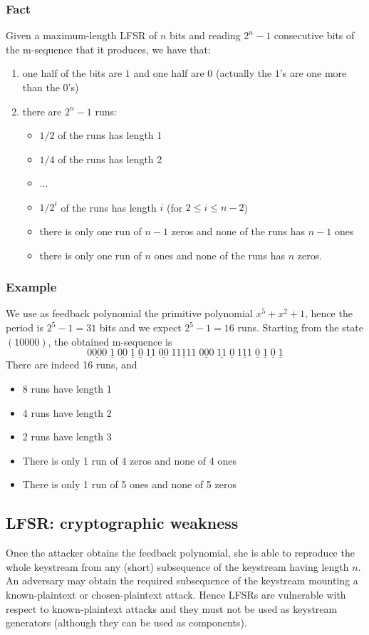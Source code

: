 \documentclass[a4paper, 10pt, titlepage]{article}
\begin{document}
\subsubsection*{Fact}
Given a maximum-length LFSR of $n$ bits and reading $2^n - 1$ consecutive bits of the m-sequence that it produces, we have that:
\begin{enumerate}
\item one half of the bits are $1$ and one half are $0$ (actually the $1$’s are one more than the $0$’s)
\item there are $2^n -1$ runs:
\begin{itemize}
\item $1/2$ of the runs has length 1
\item $1/4$ of the runs has length 2
\item ...
\item ${1/2}^i$ of the runs has length $i$ (for $2 \leq i \leq n - 2$)
\item there is only one run of $n - 1$ zeros and none of the runs has $n - 1$ ones
\item there is only one run of $n$ ones and none of the runs has $n$ zeros.
\end{itemize}
\end{enumerate}

\subsubsection*{Example}
We use as feedback polynomial the primitive polynomial $x^5 + x^2 + 1$,
hence the period is $2^5 - 1 = 31$ bits and we expect $2^5 - 1 = 16$ runs.
Starting from the state $(10000)$, the obtained m-sequence is
$$\underline{0000}\;\underline{1}\;\underline{00}\;\underline{1}\;\underline{0}\;\underline{11}\;\underline{00}\;\underline{11111}\;\underline{000}\;\underline{11}\;\underline{0}\;\underline{111}\;\underline{0}\;\underline{1}\;\underline{0}\;\underline{1}$$
There are indeed 16 runs, and
\begin{itemize}
\item 8 runs have length 1
\item 4 runs have length 2
\item 2 runs have length 3
\item There is only 1 run of 4 zeros and none of 4 ones
\item There is only 1 run of 5 ones and none of 5 zeros
\end{itemize}

\subsection{LFSR: cryptographic weakness}
Once the attacker obtains the feedback polynomial, she is able to reproduce the whole keystream from any (short) subsequence of the keystream having length $n$. An adversary may obtain the required subsequence of the keystream mounting a known-plaintext or chosen-plaintext attack. Hence LFSRs are vulnerable with respect to known-plaintext attacks and they must not be used as keystream generators (although they can be used as components).
\end{document}
